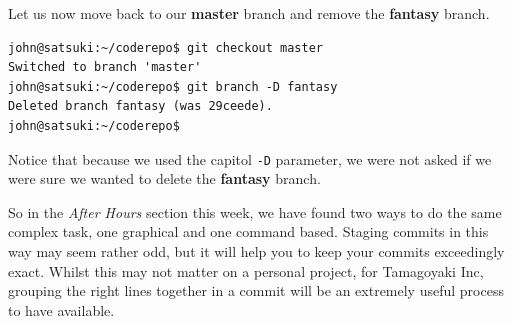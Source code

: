 Let us now move back to our \textbf{master} branch and remove the \textbf{fantasy} branch.

\begin{Verbatim}
john@satsuki:~/coderepo$ git checkout master
Switched to branch 'master'
john@satsuki:~/coderepo$ git branch -D fantasy
Deleted branch fantasy (was 29ceede).
john@satsuki:~/coderepo$
\end{Verbatim}

Notice that because we used the capitol \texttt{-D} parameter, we were not asked if we were sure we wanted to delete the \textbf{fantasy} branch.

So in the \emph{After Hours} section this week, we have found two ways to do the same complex task, one graphical and one command based.
Staging commits in this way may seem rather odd, but it will help you to keep your commits exceedingly exact.
Whilst this may not matter on a personal project, for Tamagoyaki Inc, grouping the right lines together in a commit will be an extremely useful process to have available.
